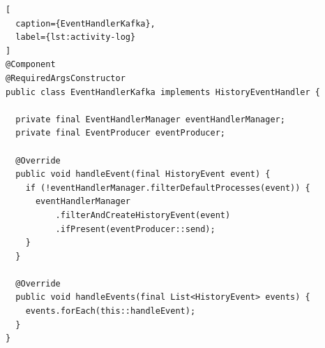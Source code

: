 \begin{lstlisting}[
  caption={EventHandlerKafka},
  label={lst:activity-log}
]
@Component
@RequiredArgsConstructor
public class EventHandlerKafka implements HistoryEventHandler {

  private final EventHandlerManager eventHandlerManager;
  private final EventProducer eventProducer;

  @Override
  public void handleEvent(final HistoryEvent event) {
    if (!eventHandlerManager.filterDefaultProcesses(event)) {
      eventHandlerManager
          .filterAndCreateHistoryEvent(event)
          .ifPresent(eventProducer::send);
    }
  }

  @Override
  public void handleEvents(final List<HistoryEvent> events) {
    events.forEach(this::handleEvent);
  }
}
\end{lstlisting}

